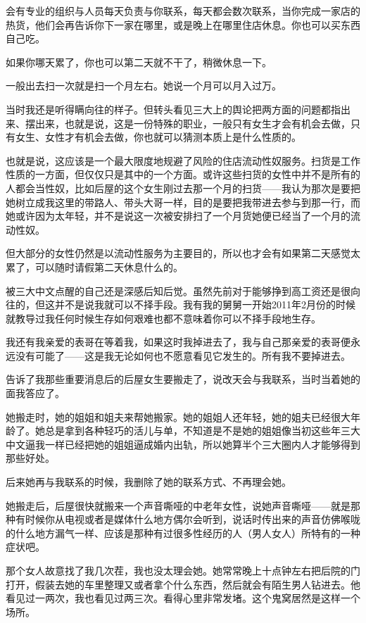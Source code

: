 \documentclass[9pt, b5paper]{article}
\begin{document}
会有专业的组织与人员每天负责与你联系，每天都会数次联系，当你完成一家店的热货，他们会再告诉你下一家在哪里，或是晚上在哪里住店休息。你也可以买东西自己吃。

如果你哪天累了，你也可以第二天就不干了，稍微休息一下。

一般出去扫一次就是扫一个月左右。她说一个月可以月入过万。

当时我还是听得瞒向往的样子。但转头看见三大上的舆论把两方面的问题都指出来、摆出来，也就是说，这是一份特殊的职业，一般只有女生才会有机会去做，只有女生、女性才有机会去做，你也就可以猜测本质上是什么性质的。 

也就是说，这应该是一个最大限度地规避了风险的住店流动性奴服务。扫货是工作性质的一方面，但仅仅只是其中的一个方面。或许这些扫货的女性中并不是所有的人都会当性奴，比如后屋的这个女生刚过去那一个月的扫货——我认为那次是要把她树立成我这里的带路人、带头大哥一样，目的是要把我带进去参与到那一行，而她或许因为太年轻，并不是说这一次被安排扫了一个月货她便已经当了一个月的流动性奴。

但大部分的女性仍然是以流动性服务为主要目的，所以也才会有如果第二天感觉太累了，可以随时请假第二天休息什么的。 

被三大中文点醒的自己还是深感后知后觉。虽然先前对于能够挣到高工资还是很向往的，但这并不是说我就可以不择手段。我有我的舅舅一开始2011年2月份的时候就教导过我任何时候生存如何艰难也都不意味着你可以不择手段地生存。 

我还有我亲爱的表哥在等着我，如果这时我掉进去了，我与自己那亲爱的表哥便永远没有可能了——这是我无论如何也不愿意看见它发生的。所有我不要掉进去。 

告诉了我那些重要消息后的后屋女生要搬走了，说改天会与我联系，当时当着她的面我答应了。

她搬走时，她的姐姐和姐夫来帮她搬家。她的姐姐人还年轻，她的姐夫已经很大年龄了。她总是拿到各种轻巧的活儿与单，不知道是不是她的姐姐像当初这些年三大中文逼我一样已经把她的姐姐逼成婚内出轨，所以她算半个三大圈内人才能够得到那些好处。

后来她再与我联系的时候，我删除了她的联系方式、不再理会她。

她搬走后，后屋很快就搬来一个声音嘶哑的中老年女性，说她声音嘶哑——就是那种有时候你从电视或者是媒体什么地方偶尔会听到，说话时传出来的声音仿佛喉咙的什么地方漏气一样、应该是那种有过很多性经历的人（男人女人）所特有的一种症状吧。 

那个女人故意找了我几次茬，我也没太理会她。她常常晚上十点钟左右把后院的门打开，假装去她的车里整理又或者拿个什么东西，然后就会有陌生男人钻进去。他看见过一两次，我也看见过两三次。看得心里非常发堵。这个鬼窝居然是这样一个场所。 
\end{document}
